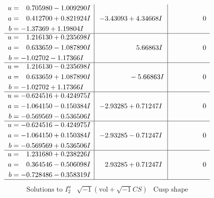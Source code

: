 \documentclass[1p]{elsarticle_modified}
\theoremstyle{definition}
\newcommand{\I}{\sqrt{-1}}
\begin{document}
$$\begin{array}{c|c|c}
\begin{aligned}
u &= \phantom{-}0.705980 - 1.009290 I \\
a &= \phantom{-}0.412700 + 0.821924 I \\
b &= -1.37369 + 1.19804 I\end{aligned}
 & -3.43093 + 4.34668 I & \phantom{-0.000000 } 0 \\ \hline\begin{aligned}
u &= \phantom{-}1.216130 + 0.235698 I \\
a &= \phantom{-}0.633659 - 1.087890 I \\
b &= -1.02702 - 1.17366 I\end{aligned}
 & \phantom{-0.000000 -}5.66863 I & \phantom{-0.000000 } 0 \\ \hline\begin{aligned}
u &= \phantom{-}1.216130 - 0.235698 I \\
a &= \phantom{-}0.633659 + 1.087890 I \\
b &= -1.02702 + 1.17366 I\end{aligned}
 & \phantom{-0.000000 } -5.66863 I & \phantom{-0.000000 } 0 \\ \hline\begin{aligned}
u &= -0.624516 + 0.424975 I \\
a &= -1.064150 - 0.150384 I \\
b &= -0.569569 - 0.536506 I\end{aligned}
 & -2.93285 + 0.71247 I & \phantom{-0.000000 } 0 \\ \hline\begin{aligned}
u &= -0.624516 - 0.424975 I \\
a &= -1.064150 + 0.150384 I \\
b &= -0.569569 + 0.536506 I\end{aligned}
 & -2.93285 - 0.71247 I & \phantom{-0.000000 } 0 \\ \hline\begin{aligned}
u &= \phantom{-}1.231680 + 0.238226 I \\
a &= \phantom{-}0.364546 - 0.506098 I \\
b &= -0.728486 - 0.358319 I\end{aligned}
 & \phantom{-}2.93285 + 0.71247 I & \phantom{-0.000000 } 0\\
 \hline 
 \end{array}$$\newpage$$\begin{array}{c|c|c}  
\text{Solutions to }I^u_{2}& \I (\text{vol} + \sqrt{-1}CS) & \text{Cusp shape}\\
 \hline 
\begin{aligned}

\end{aligned}
\end{array}$$
\end{document}
